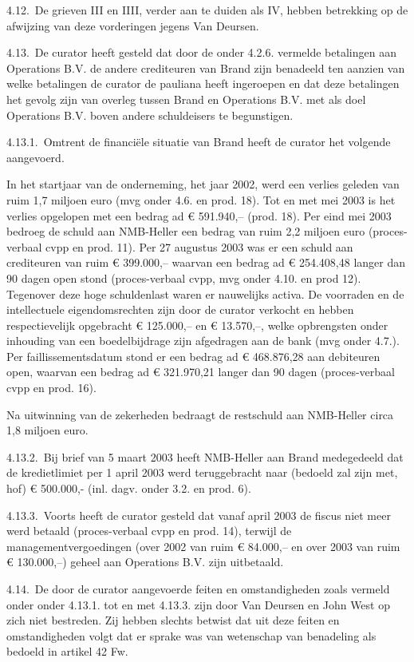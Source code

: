 \documentclass[
  dutch,
  a4paper,
]{article}
\begin{document}
4.12. De grieven III en IIII, verder aan te duiden als IV, hebben betrekking op de afwijzing van deze vorderingen jegens Van Deursen.

4.13. De curator heeft gesteld dat door de onder 4.2.6. vermelde betalingen aan Operations B.V. de andere crediteuren van Brand zijn benadeeld ten aanzien van welke betalingen de curator de pauliana heeft ingeroepen en dat deze betalingen het gevolg zijn van overleg tussen Brand en Operations B.V. met als doel Operations B.V. boven andere schuldeisers te begunstigen.

4.13.1. Omtrent de financiële situatie van Brand heeft de curator het volgende aangevoerd.

In het startjaar van de onderneming, het jaar 2002, werd een verlies geleden van ruim 1,7 miljoen euro (mvg onder 4.6. en prod. 18). Tot en met mei 2003 is het verlies opgelopen met een bedrag ad € 591.940,-- (prod. 18). Per eind mei 2003 bedroeg de schuld aan NMB-Heller een bedrag van ruim 2,2 miljoen euro (proces-verbaal cvpp en prod. 11). Per 27 augustus 2003 was er een schuld aan crediteuren van ruim € 399.000,-- waarvan een bedrag ad € 254.408,48 langer dan 90 dagen open stond (proces-verbaal cvpp, mvg onder 4.10. en prod 12). Tegenover deze hoge schuldenlast waren er nauwelijks activa. De voorraden en de intellectuele eigendomsrechten zijn door de curator verkocht en hebben respectievelijk opgebracht € 125.000,-- en € 13.570,--, welke opbrengsten onder inhouding van een boedelbijdrage zijn afgedragen aan de bank (mvg onder 4.7.). Per faillissementsdatum stond er een bedrag ad € 468.876,28 aan debiteuren open, waarvan een bedrag ad € 321.970,21 langer dan 90 dagen (proces-verbaal cvpp en prod. 16).

Na uitwinning van de zekerheden bedraagt de restschuld aan NMB-Heller circa 1,8 miljoen euro.

4.13.2. Bij brief van 5 maart 2003 heeft NMB-Heller aan Brand medegedeeld dat de kredietlimiet per 1 april 2003 werd teruggebracht naar (bedoeld zal zijn met, hof) € 500.000,- (inl. dagv. onder 3.2. en prod. 6).

4.13.3. Voorts heeft de curator gesteld dat vanaf april 2003 de fiscus niet meer werd betaald (proces-verbaal cvpp en prod. 14), terwijl de managementvergoedingen (over 2002 van ruim € 84.000,-- en over 2003 van ruim € 130.000,--) geheel aan Operations B.V. zijn uitbetaald.

4.14. De door de curator aangevoerde feiten en omstandigheden zoals vermeld onder onder 4.13.1. tot en met 4.13.3. zijn door Van Deursen en John West op zich niet bestreden. Zij hebben slechts betwist dat uit deze feiten en omstandigheden volgt dat er sprake was van wetenschap van benadeling als bedoeld in artikel 42 Fw.
\end{document}
